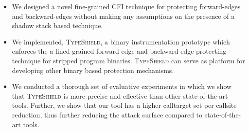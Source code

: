 \label{Contribution}
\begin{itemize}
[leftmargin=.35cm]

 \item 
 We designed a novel fine-grained CFI technique for protecting forward-edges and backward-edges 
 without making any assumptions on the presence of a shadow stack based technique.
 
 \item 
 We implemented, \textsc{TypeShield}, a binary instrumentation prototype which enforces the a fined grained forward-edge and backward-edge protecting technique
 for stripped program binaries. \textsc{TypeShield} can serve as platform for developing other binary based protection mechanisms.
 
 \item 
 We conducted a thorough set of evaluative experiments in which we show that \textsc{TypeShield} is more precise and effective than 
 other state-of-the-art tools. Further, we show that our tool has a higher calltarget set per callsite reduction, thus 
 further reducing the attack surface compared to state-of-the-art tools.
 
\end{itemize}

